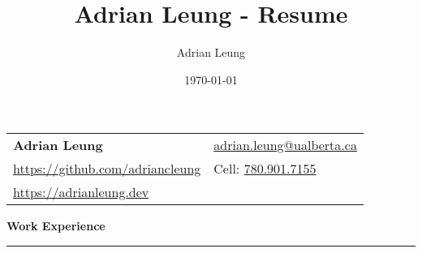 \documentclass[11pt]{article}
\title{Adrian Leung - Resume}
\author{Adrian Leung}
\date{\today}
\begin{document}
\begin{tabularx}{\textwidth}
  {
    >{\raggedright\arraybackslash}X
    >{\raggedleft\arraybackslash}X
  }
  \Large\textbf{Adrian Leung}                                             & \href{mailto:adrian.leung@ualberta.ca}{adrian.leung@ualberta.ca} \\
  \href{https://github.com/adriancleung}{https://github.com/adriancleung} & Cell: \href{tel:780.901.7155}{780.901.7155}                      \\
  \href{https://adrianleung.dev}{https://adrianleung.dev}                 &                                                                  \\
\end{tabularx}
\vspace{-15pt}

\begin{center}
  \textbf{Work Experience}
  \noindent\rule[10pt]{0.9\paperwidth}{0.4pt}
\end{center}
\vspace{-20pt}
\end{document}
